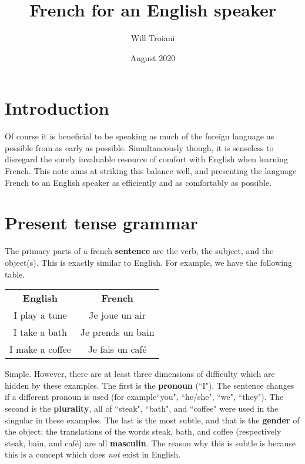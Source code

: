 \documentclass[12pt]{article}
\title{French for an English speaker}
\author{Will Troiani}
\date{August 2020}
\theoremstyle{plain}
\theoremstyle{definition}
\begin{document}
	\maketitle
	
	\section{Introduction}
	Of course it is beneficial to be speaking as much of the foreign language as possible from as early as possible. Simultaneously though, it is senseless to disregard the surely invaluable resource of comfort with English when learning French. This note aims at striking this balance well, and presenting the language French to an English speaker as efficiently and as comfortably as possible.
	
	\section{Present tense grammar}
	The primary parts of a french \textbf{sentence} are the verb, the subject, and the object(s). This is exactly similar to English. For example, we have the following table.
	\begin{center}
	\begin{tabular}{| c | c |}
		\hline
		\textbf{English} & \textbf{French}\\
		I play a tune & Je joue un air\\
		I take a bath & Je prends un bain\\
		I make a coffee & Je fais un café\\
		\hline
		\end{tabular}
	\end{center}
	Simple. However, there are at least three dimensions of difficulty which are hidden by these examples. The first is the \textbf{pronoun} (``I"). The sentence changes if a different pronoun is used (for example``you", ``he/she", ``we", ``they"). The second is the \textbf{plurality}, all of ``steak", ``bath", and ``coffee" were used in the singular in these examples. The last is the most subtle, and that is the \textbf{gender} of the object; the translations of the words steak, bath, and coffee (respectively steak, bain, and café) are all \textbf{masculin}. The reason why this is subtle is because this is a concept which does \emph{not} exist in English.
	
\end{document}
